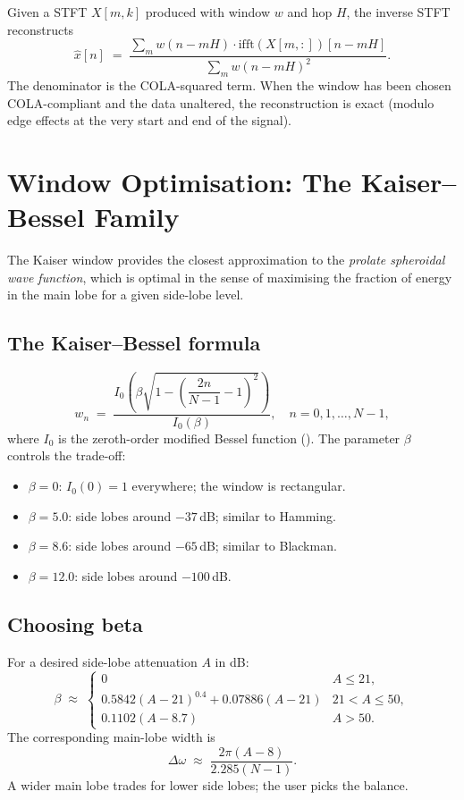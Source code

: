 Given a STFT $X[m, k]$ produced with window $w$ and hop $H$, the
inverse STFT reconstructs
\[
\hat x[n] \;=\; \frac{\sum_m w(n - mH) \cdot
\mathrm{ifft}(X[m, :])[n - mH]}{\sum_m w(n - mH)^2}.
\]
The denominator is the COLA-squared term. When the window has
been chosen COLA-compliant and the data unaltered, the
reconstruction is exact (modulo edge effects at the very start
and end of the signal).

\section{Window Optimisation: The Kaiser--Bessel Family}
\label{sec:signal_windows:kaiser_opt}

The Kaiser window \cite{kaiser_window_1980} provides the closest
approximation to the \emph{prolate spheroidal wave function},
which is optimal in the sense of maximising the fraction of
energy in the main lobe for a given side-lobe level.

\subsection{The Kaiser--Bessel formula}
\label{ssec:signal_windows:kaiser_formula}

\[
w_n \;=\; \frac{I_0\!\left(\beta \sqrt{1 - \left(\dfrac{2n}{N-1} - 1\right)^2}\right)}{I_0(\beta)},
\quad n = 0, 1, \ldots, N-1,
\]
where $I_0$ is the zeroth-order modified Bessel function
(). The parameter $\beta$ controls
the trade-off:

\begin{itemize}
  \item $\beta = 0$: $I_0(0) = 1$ everywhere; the window is
    rectangular.
  \item $\beta = 5.0$: side lobes around $-37$\,dB; similar to
    Hamming.
  \item $\beta = 8.6$: side lobes around $-65$\,dB; similar to
    Blackman.
  \item $\beta = 12.0$: side lobes around $-100$\,dB.
\end{itemize}

\subsection{Choosing beta}
\label{ssec:signal_windows:kaiser_beta}

For a desired side-lobe attenuation $A$ in dB:
\[
\beta \;\approx\;
\begin{cases}
0 & A \leq 21, \\
0.5842 (A - 21)^{0.4} + 0.07886 (A - 21) & 21 < A \leq 50, \\
0.1102 (A - 8.7) & A > 50.
\end{cases}
\]
The corresponding main-lobe width is
\[
\Delta \omega \;\approx\; \frac{2\pi (A - 8)}{2.285 (N - 1)}.
\]
A wider main lobe trades for lower side lobes; the user picks
the balance.

